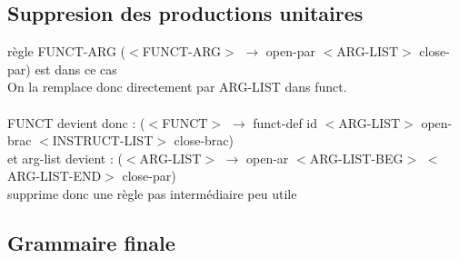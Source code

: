 \documentclass[a4paper,10pt]{article}
\begin{document}
\subsection{Suppresion des productions unitaires}
	 règle FUNCT-ARG ($<$FUNCT-ARG$>$ $\rightarrow$ open-par $<$ARG-LIST$>$ close-par) est dans ce cas\\
	On la remplace donc directement par ARG-LIST dans funct.\\
	~\\
	FUNCT devient donc : ($<$FUNCT$>$	 $\rightarrow$ funct-def id $<$ARG-LIST$>$ open-brac $<$INSTRUCT-LIST$>$ close-brac) \\
	et arg-list devient : ($<$ARG-LIST$>$  $\rightarrow$ open-ar $<$ARG-LIST-BEG$>$ $<$ARG-LIST-END$>$ close-par)\\
	supprime donc une règle pas intermédiaire peu utile











\subsection{Grammaire finale}
\end{document}
